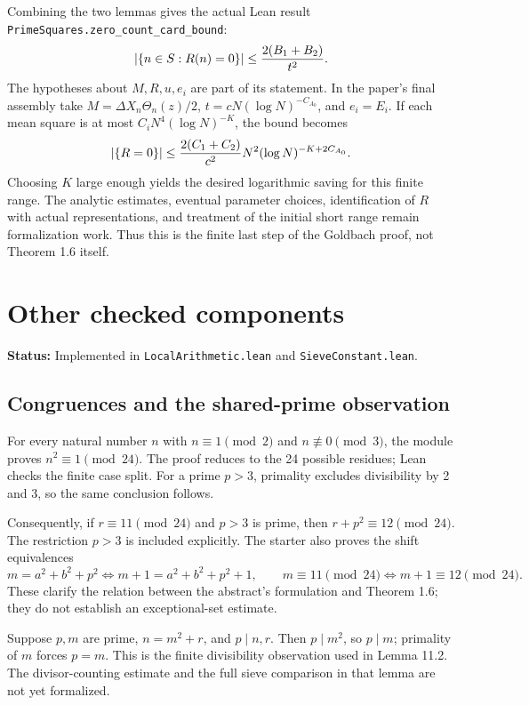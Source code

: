 \documentclass[11pt]{article}
\newcommand{\lean}[1]{\nolinkurl{#1}}
\newcommand{\status}[1]{\textbf{Status:} #1.}
\newcommand{\page}{\newpage}
\begin{document}
Combining the two lemmas gives the actual Lean result
\lean{PrimeSquares.zero_count_card_bound}:
\[
 \left|\{n\in S:R(n)=0\}\right|\le\frac{2(B_1+B_2)}{t^2}.
\]
The hypotheses about \(M,R,u,e_i\) are part of its statement. In the paper's final
assembly take \(M=\Delta X_n\Theta_n(z)/2\),
\(t=cN(\log N)^{-C_{A_0}}\), and \(e_i=E_i\).
If each mean square is at most \(C_iN^4(\log N)^{-K}\), the bound becomes
\[
 \left|\{R=0\}\right|\le
 \frac{2(C_1+C_2)}{c^2}N^2(\log N)^{-K+2C_{A_0}}.
\]
Choosing \(K\) large enough yields the desired logarithmic saving for this finite
range. The analytic estimates, eventual parameter choices, identification of \(R\)
with actual representations, and treatment of the initial short range remain
formalization work. Thus this is the finite last step of the Goldbach proof, not
Theorem 1.6 itself.

\page
\section{Other checked components}
\status{Implemented in \lean{LocalArithmetic.lean} and \lean{SieveConstant.lean}}

\subsection*{Congruences and the shared-prime observation}
For every natural number \(n\) with \(n\equiv1\pmod2\) and \(n\not\equiv0\pmod3\),
the module proves \(n^2\equiv1\pmod{24}\). The proof reduces to the 24 possible
residues; Lean checks the finite case split. For a prime \(p>3\), primality excludes
divisibility by 2 and 3, so the same conclusion follows.

Consequently, if \(r\equiv11\pmod{24}\) and \(p>3\) is prime, then
\(r+p^2\equiv12\pmod{24}\). The restriction \(p>3\) is included explicitly.
The starter also proves the shift equivalences
\[
 m=a^2+b^2+p^2\iff m+1=a^2+b^2+p^2+1,
 \qquad m\equiv11\pmod{24}\iff m+1\equiv12\pmod{24}.
\]
These clarify the relation between the abstract's formulation and Theorem 1.6;
they do not establish an exceptional-set estimate.

Suppose \(p,m\) are prime, \(n=m^2+r\), and \(p\mid n,r\). Then \(p\mid m^2\),
so \(p\mid m\); primality of \(m\) forces \(p=m\). This is the finite divisibility
observation used in Lemma 11.2. The divisor-counting estimate and the full sieve
comparison in that lemma are not yet formalized.
\end{document}
